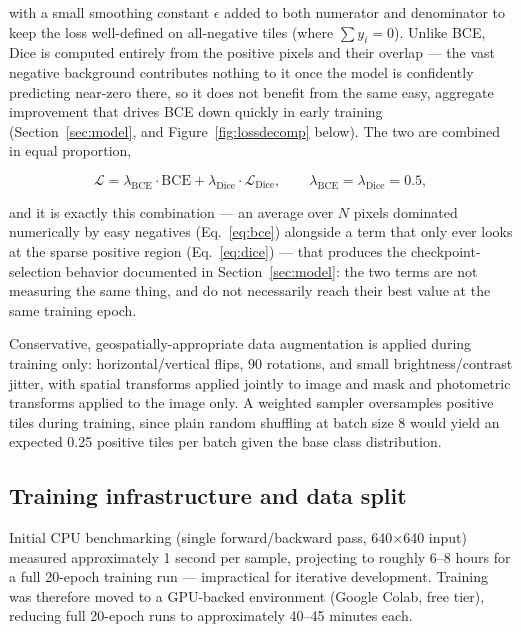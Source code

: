 \documentclass[11pt,a4paper]{article}
\begin{document}
with a small smoothing constant $\epsilon$ added to both numerator and
denominator to keep the loss well-defined on all-negative tiles (where
$\sum y_i = 0$). Unlike BCE, Dice is computed entirely from the positive
pixels and their overlap --- the vast negative background contributes
nothing to it once the model is confidently predicting near-zero there, so
it does not benefit from the same easy, aggregate improvement that drives
BCE down quickly in early training (Section~\ref{sec:model}, and
Figure~\ref{fig:lossdecomp} below). The two are combined in equal
proportion,

\begin{equation}
\mathcal{L} = \lambda_{\mathrm{BCE}} \cdot \mathrm{BCE} + \lambda_{\mathrm{Dice}} \cdot \mathcal{L}_{\mathrm{Dice}}, \qquad
\lambda_{\mathrm{BCE}} = \lambda_{\mathrm{Dice}} = 0.5,
\label{eq:combined}
\end{equation}

and it is exactly this combination --- an average over $N$ pixels
dominated numerically by easy negatives (Eq.~\ref{eq:bce}) alongside a
term that only ever looks at the sparse positive region
(Eq.~\ref{eq:dice}) --- that produces the checkpoint-selection behavior
documented in Section~\ref{sec:model}: the two terms are not measuring the
same thing, and do not necessarily reach their best value at the same
training epoch.

Conservative, geospatially-appropriate data augmentation is applied during
training only: horizontal/vertical flips, 90\textdegree{} rotations, and
small brightness/contrast jitter, with spatial transforms applied jointly to
image and mask and photometric transforms applied to the image only.
A weighted sampler oversamples positive tiles during training, since plain
random shuffling at batch size 8 would yield an expected 0.25 positive tiles
per batch given the base class distribution.

\subsection{Training infrastructure and data split}
Initial CPU benchmarking (single forward/backward pass, 640$\times$640
input) measured approximately 1 second per sample, projecting to roughly 6--8
hours for a full 20-epoch training run --- impractical for iterative
development. Training was therefore moved to a GPU-backed environment
(Google Colab, free tier), reducing full 20-epoch runs to approximately
40--45 minutes each.
\end{document}
